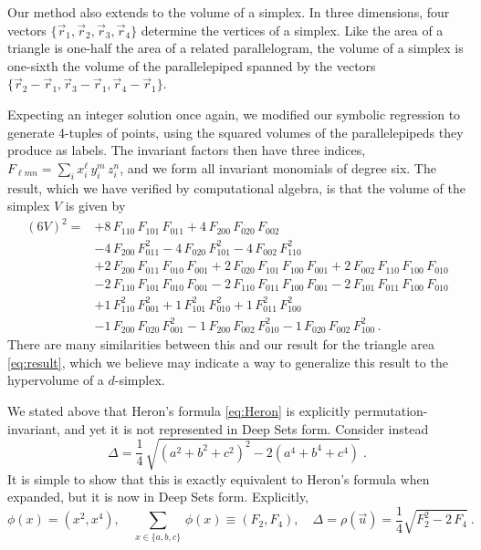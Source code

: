 \documentclass[12pt]{article}
\newcommand{\pseudosection}[1]
{}
\begin{document}
\pseudosection{Generalizations: simplex volume}

Our method also extends to the volume of a simplex. In three dimensions, four vectors $\{ \vec{r}_1, \vec{r}_2, \vec{r}_3, \vec{r}_4 \}$ determine the vertices of a simplex. 
Like the area of a triangle is one-half the area of a related parallelogram, the volume of a simplex is one-sixth the volume of the parallelepiped spanned by the vectors $\{ \vec{r}_2 - \vec{r}_1, \vec{r}_3 - \vec{r}_1, \vec{r}_4 - \vec{r}_1 \}$. 

Expecting an integer solution once again, we modified our symbolic regression to generate 4-tuples of points, using the squared volumes of the parallelepipeds they produce as labels. 
The invariant factors then have three indices, $F_{\ell m n} = \sum_i x_i^\ell \, y_i^m \, z_i^n$, and we form all invariant monomials of degree six.
The result, which we have verified by computational algebra, is that the volume of the simplex $V$ is given by
\begin{align}
(6 V)^2 = &
+8 \, F_{110} \, F_{101} \, F_{011}
+4 \, F_{200} \, F_{020} \, F_{002}
\nonumber \\ &
-4 \, F_{200} \, F_{011}^2
-4 \, F_{020} \, F_{101}^2
-4 \, F_{002} \, F_{110}^2
\nonumber \\ &
+2 \, F_{200} \, F_{011} \, F_{010} \, F_{001}
+2 \, F_{020} \, F_{101} \, F_{100} \, F_{001}
+2 \, F_{002} \, F_{110} \, F_{100} \, F_{010}
\nonumber \\ &
-2 \, F_{110} \, F_{101} \, F_{010} \, F_{001}
-2 \, F_{110} \, F_{011} \, F_{100} \, F_{001}
-2 \, F_{101} \, F_{011} \, F_{100} \, F_{010}
\nonumber \\ &
+1 \, F_{110}^2 \, F_{001}^2
+1 \, F_{101}^2 \, F_{010}^2
+1 \, F_{011}^2 \, F_{100}^2
\nonumber \\ &
-1 \, F_{200} \, F_{020} \, F_{001}^2
-1 \, F_{200} \, F_{002} \, F_{010}^2
-1 \, F_{020} \, F_{002} \, F_{100}^2 \, .
\label{eq:simplex}
\end{align}
There are many similarities between this and our result for the triangle area \eqref{eq:result}, which we believe may indicate a way to generalize this result to the hypervolume of a $d$-simplex.

\pseudosection{Generalizations: Heron symmetrized}

We stated above that Heron's formula \eqref{eq:Heron} is explicitly permutation-invariant, and yet it is not represented in Deep Sets form. Consider instead
\begin{equation}
\label{eq:HeronDeepSets}
    \Delta = \frac{1}{4} \, \sqrt{
        \left( a^2 + b^2 + c^2 \right)^2
        - 2 \left( a^4 + b^4 + c^4 \right)
    }~.
\end{equation}
It is simple to show that this is exactly equivalent to Heron's formula when expanded, but it is now in Deep Sets form. Explicitly,
\begin{equation}
    \phi(x) = (x^2, x^4), \quad
    {\textstyle \sum_{x \in \{ a, b, c \}}} \, \phi(x)
    \equiv (F_2, F_4) , \quad
    \Delta = \rho(\vec{u}) = \frac{1}{4} \sqrt{ F_2^2 - 2 \, F_4 }~.
\end{equation}
\end{document}
